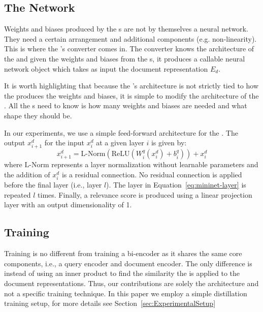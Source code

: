 \documentclass[sigconf,]{acmart}
\begin{document}
\subsection{The \mininame{} Network}

Weights and biases produced by the \hyperheadlayer{}s are not by themselves a neural network. They need a certain arrangement and additional components (e.g. non-linearity). This is where the \name{}'s \mininame{} converter comes in. The converter knows the architecture of the \mininame{} and given the weights and biases from the \hyperheadlayer{}s, it produces a callable neural network object which takes as input the document representation $E_d$.

It is worth highlighting that because the \mininame{}'s architecture is not strictly tied to how the \hyperheadlayer{} produces the weights and biases, it is simple to modify the architecture of the \mininame{}. All the \hyperheadlayer{}s need to know is how many weights and biases are needed and what shape they should be.

In our experiments, we use a simple feed-forward architecture for the \mininame{}. The output $x^d_{i+1}$ for the input $x^d_i$ at a given layer $i$ is given by:
\begin{equation}
    x^d_{i+1} = \text{L-Norm}\left(\text{ReLU}(W^q_i(x^d_i) + b^q_i)\right) + x^d_i
\label{eq:mininet-layer}
\end{equation}
where $\text{L-Norm}$ represents a layer normalization without learnable parameters and the addition of $x^d_i$ is a residual connection. No residual connection is applied before the final layer (i.e., layer $l$). The layer in Equation~\eqref{eq:mininet-layer} is repeated $l$ times. Finally, a relevance score is produced using a linear projection layer with an output dimensionality of 1.

\subsection{Training}
Training \name{} is no different from training a bi-encoder as it shares the same core components, i.e., a query encoder and document encoder. The only difference is instead of using an inner product to find the similarity the \mininame{} is applied to the document representations. Thus, our contributions are solely the architecture and not a specific training technique. In this paper we employ a simple distillation training setup, for more details see Section~\ref{sec:ExperimentalSetup}
\end{document}
